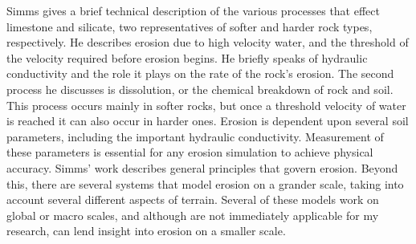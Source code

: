 Simms \cite{Simms-TortoisesAndHares} gives a brief technical description of the various processes that effect limestone and silicate, two representatives of softer and harder rock types, respectively. He describes erosion
due to high velocity water, and the threshold of the velocity required before erosion begins. He briefly speaks of hydraulic conductivity and the role it plays on the rate of the rock's erosion. The second process he discusses is dissolution, or the chemical breakdown of rock and soil. This process occurs mainly in softer rocks, but once a threshold velocity of water is reached it can also occur in harder ones. Erosion is dependent upon several soil parameters, including the important hydraulic conductivity. Measurement of these parameters is essential for any erosion simulation to achieve physical accuracy.
% 
Simms' work describes general principles that govern erosion. Beyond this, there are several systems that model erosion on a grander scale, taking into account several different aspects of terrain. Several of these models work on global or macro scales, and although are not immediately applicable for my research, can lend insight into erosion on a smaller scale.


